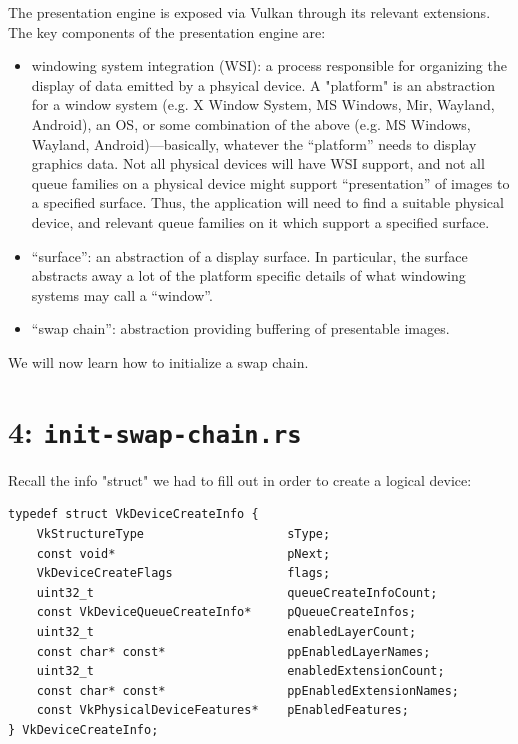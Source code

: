 \documentclass[12pt,letterpaper]{article}
\newcommand{\inquotes}[1]{``#1''}	%
\begin{document}
    The presentation engine is exposed via Vulkan through its relevant extensions. The key components of the presentation engine are:
        \begin{itemize}
            \item windowing system integration (WSI): a process responsible for organizing the display of data emitted by a phsyical device. A "platform" is an abstraction for a window system (e.g. X Window System, MS Windows, Mir, Wayland, Android), an OS, or some combination of the above (e.g. MS Windows, Wayland, Android)---basically, whatever the \inquotes{platform} needs to display graphics data. Not all physical devices will have WSI support, and not all queue families on a physical device might support \inquotes{presentation} of images to a specified surface. Thus, the application will need to find a suitable physical device, and relevant queue families on it which support a specified surface.
            
            \item \inquotes{surface}: an abstraction of a display surface. In particular, the surface abstracts away a lot of the platform specific details of what windowing systems may call a \inquotes{window}.
            
            \item \inquotes{swap chain}: abstraction providing buffering of presentable images. 
        \end{itemize}

    We will now learn how to initialize a swap chain.

    
\section{4: \texttt{init-swap-chain.rs}}

    Recall the info "struct" we had to fill out in order to create a logical device:
\begin{verbatim}
typedef struct VkDeviceCreateInfo {
	VkStructureType                    sType;
	const void*                        pNext;
	VkDeviceCreateFlags                flags;
	uint32_t                           queueCreateInfoCount;
	const VkDeviceQueueCreateInfo*     pQueueCreateInfos;
	uint32_t                           enabledLayerCount;
	const char* const*                 ppEnabledLayerNames;
	uint32_t                           enabledExtensionCount;
	const char* const*                 ppEnabledExtensionNames;
	const VkPhysicalDeviceFeatures*    pEnabledFeatures;
} VkDeviceCreateInfo;
\end{verbatim}
\end{document}
